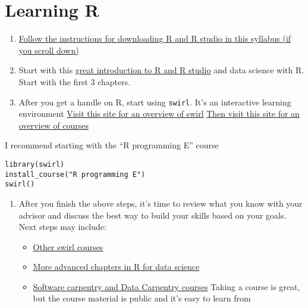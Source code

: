 \documentclass[
  letterpaper,
  DIV=11,
  numbers=noendperiod]{scrreprt}
\begin{document}
\hypertarget{learning-r}{%
\section*{\texorpdfstring{\textbf{Learning
R}}{Learning R}}\label{learning-r}}

\begin{enumerate}
\def\labelenumi{\arabic{enumi}.}
\item
  \href{https://docs.google.com/document/d/1-qm-gVOIb-k61PxlQvav_GZXgmZP4t7q1fjs4BN_Ov8/edit\#heading=h.jl4d8sgkpjrk}{Follow
  the instructions for downloading R and R studio in this syllabus (if
  you scroll down)}
\item
  Start with this
  \href{https://rafalab.github.io/dsbook/getting-started.html}{great
  introduction to R and R studio} and data science with R. Start with
  the first 3 chapters.
\item
  After you get a handle on R, start using \texttt{swirl}. It's an
  interactive learning environment
  \href{https://swirlstats.com/students.html}{Visit this site for an
  overview of swirl}
  \href{https://github.com/swirldev/swirl_courses\#swirl-courses}{Then
  visit this site for an overview of courses}
\end{enumerate}

I recommend starting with the ``R programming E'' course

\begin{verbatim}
library(swirl)
install_course("R programming E")
swirl()
\end{verbatim}

\begin{enumerate}
\def\labelenumi{\arabic{enumi}.}
\item
  After you finish the above steps, it's time to review what you know
  with your advisor and discuss the best way to build your skills based
  on your goals. Next steps may include:

  \begin{itemize}
  \item
    \href{https://swirlstats.com/scn/title.html}{Other swirl courses}
  \item
    \href{https://rafalab.github.io/dsbook/getting-started.html}{More
    advanced chapters in R for data science}
  \item
    \href{https://carpentries.org/}{Software carpentry and Data
    Carpentry courses} Taking a course is great, but the course material
    is public and it's easy to learn from
  \end{itemize}
\end{enumerate}
\end{document}
